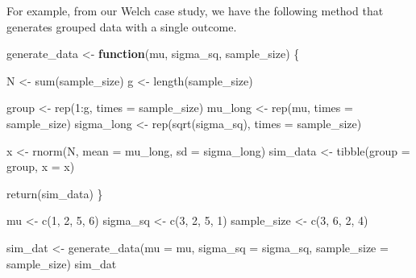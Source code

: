 \documentclass[
]{book}
\newenvironment{Shaded}{\begin{snugshade}}{\end{snugshade}}
\newcommand{\AttributeTok}[1]{\textcolor[rgb]{0.77,0.63,0.00}{#1}}
\newcommand{\ControlFlowTok}[1]{\textcolor[rgb]{0.13,0.29,0.53}{\textbf{#1}}}
\newcommand{\DecValTok}[1]{\textcolor[rgb]{0.00,0.00,0.81}{#1}}
\newcommand{\FunctionTok}[1]{\textcolor[rgb]{0.00,0.00,0.00}{#1}}
\newcommand{\NormalTok}[1]{#1}
\newcommand{\OtherTok}[1]{\textcolor[rgb]{0.56,0.35,0.01}{#1}}
\newcommand{\SpecialCharTok}[1]{\textcolor[rgb]{0.00,0.00,0.00}{#1}}
\begin{document}
For example, from our Welch case study, we have the following method that generates grouped data with a single outcome.

\begin{Shaded}
\begin{Highlighting}[]
\NormalTok{generate\_data }\OtherTok{\textless{}{-}} \ControlFlowTok{function}\NormalTok{(mu, sigma\_sq, sample\_size) \{}

\NormalTok{  N }\OtherTok{\textless{}{-}} \FunctionTok{sum}\NormalTok{(sample\_size) }
\NormalTok{  g }\OtherTok{\textless{}{-}} \FunctionTok{length}\NormalTok{(sample\_size) }
  
\NormalTok{  group }\OtherTok{\textless{}{-}} \FunctionTok{rep}\NormalTok{(}\DecValTok{1}\SpecialCharTok{:}\NormalTok{g, }\AttributeTok{times =}\NormalTok{ sample\_size) }
\NormalTok{  mu\_long }\OtherTok{\textless{}{-}} \FunctionTok{rep}\NormalTok{(mu, }\AttributeTok{times =}\NormalTok{ sample\_size)}
\NormalTok{  sigma\_long }\OtherTok{\textless{}{-}} \FunctionTok{rep}\NormalTok{(}\FunctionTok{sqrt}\NormalTok{(sigma\_sq), }\AttributeTok{times =}\NormalTok{ sample\_size) }
  
\NormalTok{  x }\OtherTok{\textless{}{-}} \FunctionTok{rnorm}\NormalTok{(N, }\AttributeTok{mean =}\NormalTok{ mu\_long, }\AttributeTok{sd =}\NormalTok{ sigma\_long)}
\NormalTok{  sim\_data }\OtherTok{\textless{}{-}} \FunctionTok{tibble}\NormalTok{(}\AttributeTok{group =}\NormalTok{ group, }\AttributeTok{x =}\NormalTok{ x)}
    
  \FunctionTok{return}\NormalTok{(sim\_data)}
\NormalTok{\}}

\NormalTok{mu }\OtherTok{\textless{}{-}} \FunctionTok{c}\NormalTok{(}\DecValTok{1}\NormalTok{, }\DecValTok{2}\NormalTok{, }\DecValTok{5}\NormalTok{, }\DecValTok{6}\NormalTok{)}
\NormalTok{sigma\_sq }\OtherTok{\textless{}{-}} \FunctionTok{c}\NormalTok{(}\DecValTok{3}\NormalTok{, }\DecValTok{2}\NormalTok{, }\DecValTok{5}\NormalTok{, }\DecValTok{1}\NormalTok{)}
\NormalTok{sample\_size }\OtherTok{\textless{}{-}} \FunctionTok{c}\NormalTok{(}\DecValTok{3}\NormalTok{, }\DecValTok{6}\NormalTok{, }\DecValTok{2}\NormalTok{, }\DecValTok{4}\NormalTok{)}

\NormalTok{sim\_dat }\OtherTok{\textless{}{-}} \FunctionTok{generate\_data}\NormalTok{(}\AttributeTok{mu =}\NormalTok{ mu, }
                         \AttributeTok{sigma\_sq =}\NormalTok{ sigma\_sq, }
                         \AttributeTok{sample\_size =}\NormalTok{ sample\_size)}
\NormalTok{sim\_dat}
\end{Highlighting}
\end{Shaded}
\end{document}

